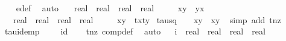 \begin{isabellebody}
%
\isadelimproof
\ \ %
\endisadelimproof
%
\isatagproof
{}\isamarkupfalse%
\ e{\isacharprime}{\isacharunderscore}def\ \isamarkupfalse%
\ auto%
\endisatagproof
{\isafoldproof}%
%
\isadelimproof
\isanewline
%
\endisadelimproof
\isanewline
{}\isamarkupfalse%
\ {\isasymrho}\ {\isacharcolon}{\isacharcolon}\ {\isachardoublequoteopen}real\ {\isasymtimes}\ real\ {\isasymRightarrow}\ real\ {\isasymtimes}\ real{\isachardoublequoteclose}\ \ \isanewline
\ \ {\isachardoublequoteopen}{\isasymrho}\ {\isacharparenleft}x{\isacharcomma}y{\isacharparenright}\ {\isacharequal}\ {\isacharparenleft}{\isacharminus}y{\isacharcomma}x{\isacharparenright}{\isachardoublequoteclose}\isanewline
{}\isamarkupfalse%
\ {\isasymtau}\ {\isacharcolon}{\isacharcolon}\ {\isachardoublequoteopen}real\ {\isasymtimes}\ real\ {\isasymRightarrow}\ real\ {\isasymtimes}\ real{\isachardoublequoteclose}\ \ \isanewline
\ \ {\isachardoublequoteopen}{\isasymtau}\ {\isacharparenleft}x{\isacharcomma}y{\isacharparenright}\ {\isacharequal}\ {\isacharparenleft}{}{\isacharslash}{\isacharparenleft}t{\isacharasterisk}x{\isacharparenright}{\isacharcomma}{}{\isacharslash}{\isacharparenleft}t{\isacharasterisk}y{\isacharparenright}{\isacharparenright}{\isachardoublequoteclose}\isanewline
\isanewline
{}\isamarkupfalse%
\ tau{\isacharunderscore}sq{\isacharcolon}\ {\isachardoublequoteopen}{\isacharparenleft}{\isasymtau}\ {\isasymcirc}\ {\isasymtau}{\isacharparenright}\ {\isacharparenleft}x{\isacharcomma}y{\isacharparenright}\ {\isacharequal}\ {\isacharparenleft}x{\isacharcomma}y{\isacharparenright}{\isachardoublequoteclose}%
\isadelimproof
\ %
\endisadelimproof
%
\isatagproof
{}\isamarkupfalse%
{\isacharparenleft}simp\ add{\isacharcolon}\ t{\isacharunderscore}nz{\isacharparenright}%
\endisatagproof
{\isafoldproof}%
%
\isadelimproof
%
\endisadelimproof
\isanewline
\isanewline
{}\isamarkupfalse%
\ tau{\isacharunderscore}idemp{\isacharcolon}\ {\isachardoublequoteopen}{\isasymtau}\ {\isasymcirc}\ {\isasymtau}\ {\isacharequal}\ id{\isachardoublequoteclose}\isanewline
%
\isadelimproof
\ \ %
\endisadelimproof
%
\isatagproof
{}\isamarkupfalse%
\ t{\isacharunderscore}nz\ comp{\isacharunderscore}def\ \isamarkupfalse%
\ auto%
\endisatagproof
{\isafoldproof}%
%
\isadelimproof
\ \isanewline
%
\endisadelimproof
\isanewline
{}\isamarkupfalse%
\ i\ {\isacharcolon}{\isacharcolon}\ {\isachardoublequoteopen}real\ {\isasymtimes}\ real\ {\isasymRightarrow}\ real\ {\isasymtimes}\ real{\isachardoublequoteclose}\ \ \isanewline

\end{isabellebody}
